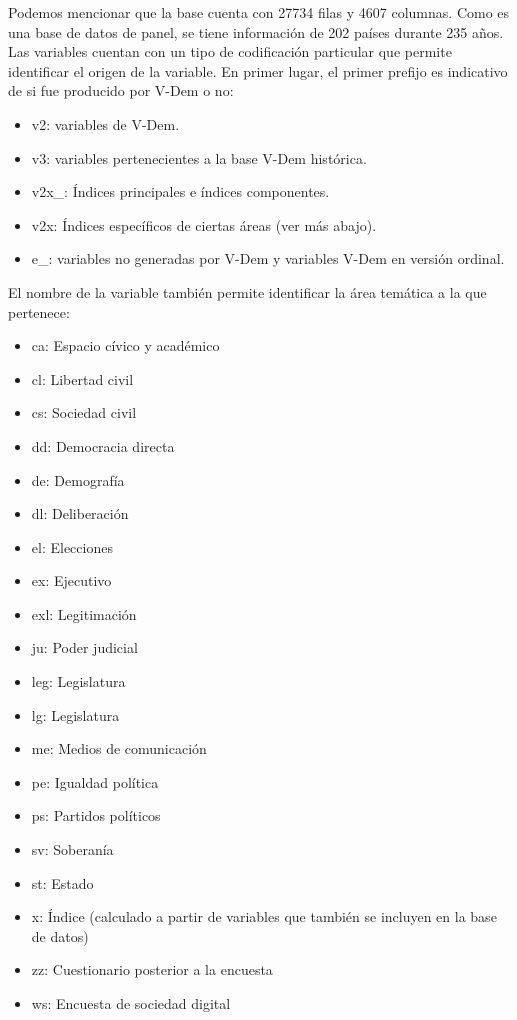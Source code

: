 \documentclass{article}
\begin{document}
Podemos mencionar que la base cuenta con 27734 filas y 4607 columnas. Como es una 
base de datos de panel, se tiene información de 202 países durante 235 años. Las 
variables cuentan con un tipo de codificación particular que permite identificar el 
origen de la  variable. En primer lugar, el primer prefijo es indicativo de si fue 
producido por V-Dem o no:

\begin{itemize}
  \item v2: variables de V-Dem.
  \item v3: variables pertenecientes a la base V-Dem histórica.
  \item v2x\_: Índices principales e índices componentes.
  \item v2x: Índices específicos de ciertas 
  áreas (ver más abajo).
  \item e\_: variables no generadas por V-Dem y variables V-Dem en versión ordinal.
\end{itemize}

El nombre de la variable también permite identificar la área temática a la que 
pertenece:

\begin{itemize}
  \item ca: Espacio cívico y académico
  \item cl: Libertad civil
  \item cs: Sociedad civil
  \item dd: Democracia directa
  \item de: Demografía
  \item dl: Deliberación
  \item el: Elecciones
  \item ex: Ejecutivo
  \item exl: Legitimación
  \item ju: Poder judicial
  \item leg: Legislatura
  \item lg: Legislatura
  \item me: Medios de comunicación
  \item pe: Igualdad política
  \item ps: Partidos políticos
  \item sv: Soberanía
  \item st: Estado
  \item x: Índice (calculado a partir de variables que también se 
  incluyen en la base de datos)
  \item zz: Cuestionario posterior a la encuesta
  \item ws: Encuesta de sociedad digital
\end{itemize}
\end{document}
